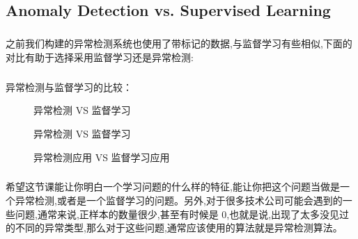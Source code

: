 \documentclass{article}
\begin{document}
\begin{CJK}{UTF8}{gbsn}
\subsection{Anomaly Detection vs. Supervised Learning}
\subparagraph{}
之前我们构建的异常检测系统也使用了带标记的数据,与监督学习有些相似,下面的对比有助于选择采用监督学习还是异常检测:
\subparagraph{}
异常检测与监督学习的比较：
\begin{figure}[H]
\label{fig:936}
\caption{异常检测 VS 监督学习}
\end{figure}
\begin{figure}[H]
\label{fig:938}
\caption{异常检测 VS 监督学习}
\end{figure}
\begin{figure}[H]
\label{fig:939}
\caption{异常检测应用 VS 监督学习应用}
\end{figure}
\begin{figure}[H]
\label{fig:940}
\end{figure}
\subparagraph{}
希望这节课能让你明白一个学习问题的什么样的特征,能让你把这个问题当做是一个异常检测,或者是一个监督学习的问题。另外,对于很多技术公司可能会遇到的一些问题,通常来说,正样本的数量很少,甚至有时候是 0,也就是说,出现了太多没见过的不同的异常类型,那么对于这些问题,通常应该使用的算法就是异常检测算法。

\end{CJK}
\end{document}
